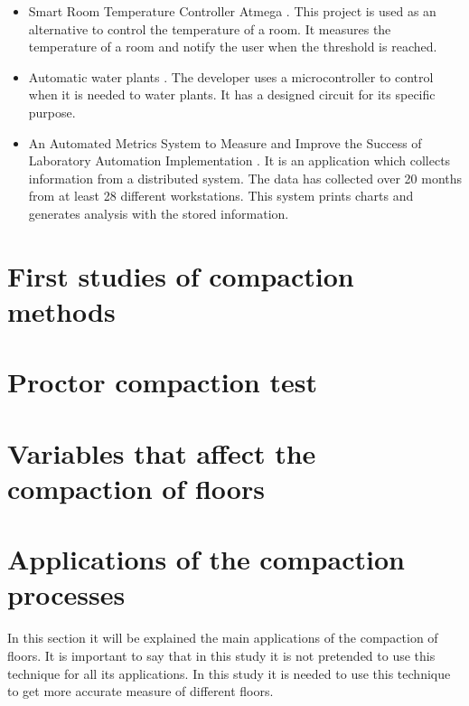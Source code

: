 \begin{itemize}

\item Smart Room Temperature Controller Atmega \cite{smart_room_controller}. This project is used as an alternative to control the temperature of a room. It measures the temperature of a room and notify the user when the threshold is reached.

\item Automatic water plants \cite{diy_blokefollow_watering_nodate}. The developer uses a microcontroller to control when it is needed to water plants. It has a designed circuit for its specific purpose.

\item An Automated Metrics System to Measure and Improve the Success of Laboratory Automation Implementation \cite{benn_automated_2006}. It is an application which collects information from a distributed system. The data has collected over 20 months from at least 28 different workstations. This system prints charts and generates analysis with the stored information.

\end{itemize}

\section{First studies of compaction methods}

\section{Proctor compaction test}

\section{Variables that affect the compaction of floors}

\section{Applications of the compaction processes}

In this section it will be explained the main applications of the compaction of floors. It is important to say that in this study it is not pretended to use this technique for all its applications. In this study it is needed to use this technique to get more accurate measure of different floors.\\

